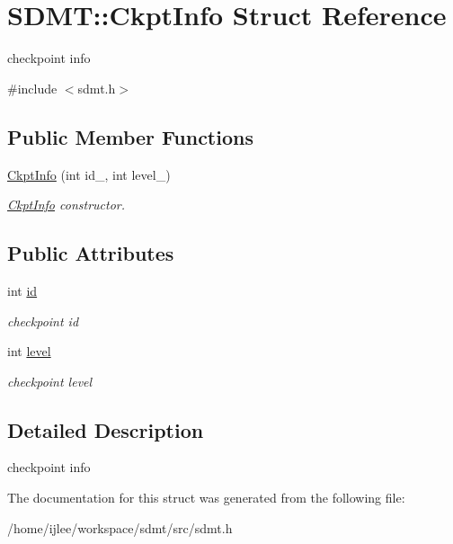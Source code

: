 \hypertarget{struct_s_d_m_t_1_1_ckpt_info}{}\section{S\+D\+MT\+:\+:Ckpt\+Info Struct Reference}
\label{struct_s_d_m_t_1_1_ckpt_info}


checkpoint info  




{\ttfamily \#include $<$sdmt.\+h$>$}

\subsection*{Public Member Functions}
\begin{DoxyCompactItemize}
\item 
\mbox{\label{struct_s_d_m_t_1_1_ckpt_info_a2556be85ca8c498984a94f9e4631ee9a}} 
\hyperlink{struct_s_d_m_t_1_1_ckpt_info_a2556be85ca8c498984a94f9e4631ee9a}{Ckpt\+Info} (int id\+\_\+, int level\+\_\+)
\begin{DoxyCompactList}\small\item\em \hyperlink{struct_s_d_m_t_1_1_ckpt_info}{Ckpt\+Info} constructor. \end{DoxyCompactList}\end{DoxyCompactItemize}
\subsection*{Public Attributes}
\begin{DoxyCompactItemize}
\item 
\mbox{\label{struct_s_d_m_t_1_1_ckpt_info_aeb67008d2f1294435c1a07a22ad691ff}} 
int \hyperlink{struct_s_d_m_t_1_1_ckpt_info_aeb67008d2f1294435c1a07a22ad691ff}{id}
\begin{DoxyCompactList}\small\item\em checkpoint id \end{DoxyCompactList}\item 
\mbox{\label{struct_s_d_m_t_1_1_ckpt_info_a552a2b7a4cb67498389e41b9dbc93a87}} 
int \hyperlink{struct_s_d_m_t_1_1_ckpt_info_a552a2b7a4cb67498389e41b9dbc93a87}{level}
\begin{DoxyCompactList}\small\item\em checkpoint level \end{DoxyCompactList}\end{DoxyCompactItemize}


\subsection{Detailed Description}
checkpoint info 

The documentation for this struct was generated from the following file\+:\begin{DoxyCompactItemize}
\item 
/home/ijlee/workspace/sdmt/src/sdmt.\+h\end{DoxyCompactItemize}
